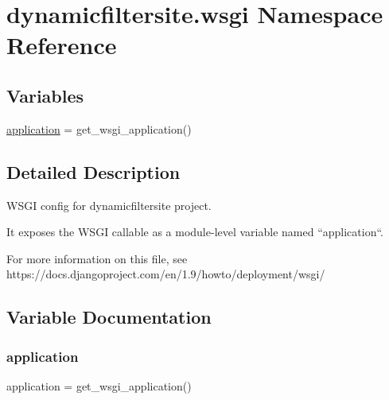 \hypertarget{namespacedynamicfiltersite_1_1wsgi}{}\section{dynamicfiltersite.\+wsgi Namespace Reference}
\label{namespacedynamicfiltersite_1_1wsgi}
\subsection*{Variables}
\begin{DoxyCompactItemize}
\item 
\hyperlink{namespacedynamicfiltersite_1_1wsgi_a9556574144704032c9e6bafa10276622}{application} = get\+\_\+wsgi\+\_\+application()
\end{DoxyCompactItemize}


\subsection{Detailed Description}
\begin{DoxyVerb}WSGI config for dynamicfiltersite project.

It exposes the WSGI callable as a module-level variable named ``application``.

For more information on this file, see
https://docs.djangoproject.com/en/1.9/howto/deployment/wsgi/
\end{DoxyVerb}
 

\subsection{Variable Documentation}
\mbox{\label{namespacedynamicfiltersite_1_1wsgi_a9556574144704032c9e6bafa10276622}} 
\subsubsection{\texorpdfstring{application}{application}}
{\footnotesize\ttfamily application = get\+\_\+wsgi\+\_\+application()}

